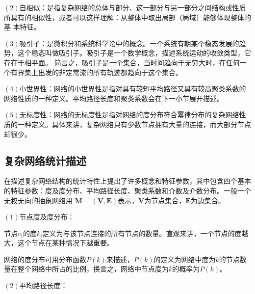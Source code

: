 $(2)$自相似：是指复杂网络的总体与部分、这一部分与另一部分之间结构或性质所具有的相似性，或者可以这样理解：从整体中取出局部（局域）能够体现整体的基
本特征。

$(3)$吸引子：是微积分和系统科学论中的概念。一个系统有朝某个稳态发展的趋势，这个稳态叫做吸引子。吸引子是一个数学概念，描述系统运动的收敛类型，它存在于相平面。
简言之，吸引子是一个集合，当时间趋向于无穷大时，在任何一个有界集上出发的非定常流的所有轨迹都趋向于这个集合。

$(4)$小世界性：网络的小世界性是指对具有较短平均路径又具有较高聚类系数的网络性质的一种定义。平均路径长度和聚类系数会在下一小节展开描述。

$(5)$无标度性：网络的无标度性是指对网络的度分布符合幂律分布的复杂网络性质的一种定义。具体来讲，复杂网络只有少数节点拥有大量的连接，而大部分节点却很少。









\subsection{复杂网络统计描述}
\label{sec:feature}
在描述复杂网络结构的统计特性上提出了许多概念和特征参数，其中包含四个基本的特征参数：度及度分布、平均路径长度、聚类系数和介数及介数分布。一般一个无权无向的抽象网络用
$\boldsymbol{M}=(\boldsymbol{V}, \boldsymbol{E})$表示，$\boldsymbol{V}$为节点集合，$\boldsymbol{E}$为边集合。

$(1)$节点度及度分布：

节点$v_i$的度$k_i$定义为与该节点连接的所有节点的数量。直观来讲，一个节点的度越大，这个节点在某种情况下越重要。

网络的度分布可用分布函数$P(k)$来描述，$P(k)$的定义为网络中度为$k$的节点数量在整个网络中所占的比例，换言之，网络中节点度为$k$的概率为$P(k)$。

$(2)$平均路径长度：

